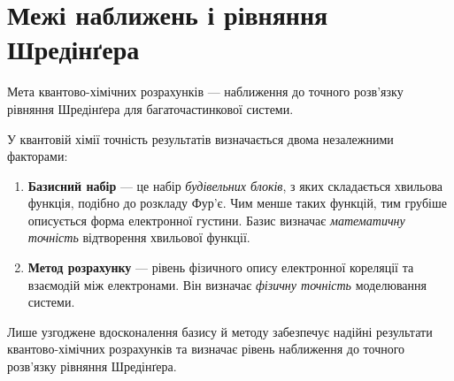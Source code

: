 \section{Межі наближень і рівняння Шредінґера}


Мета квантово-хімічних розрахунків --- наближення до точного розв’язку рівняння Шредінґера для багаточастинкової системи.


У квантовій хімії точність результатів визначається двома незалежними факторами:
\begin{enumerate}
    \item \textbf{Базисний набір} --- це набір \emph{будівельних блоків}, з яких складається хвильова функція, подібно до розкладу Фур’є.
    Чим менше таких функцій, тим грубіше описується форма електронної густини.
    Базис визначає \emph{математичну точність} відтворення хвильової функції.
    \item \textbf{Метод розрахунку} --- рівень фізичного опису електронної кореляції та взаємодій між електронами.
    Він визначає \emph{фізичну точність} моделювання системи.
\end{enumerate}
\noindent
Лише узгоджене вдосконалення базису й методу забезпечує надійні результати квантово-хімічних розрахунків та визначає рівень наближення до точного розв’язку рівняння Шредінґера.

